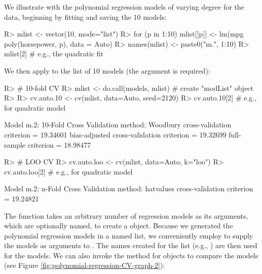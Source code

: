 \documentclass[
]{jss}
\begin{document}
We illustrate with the polynomial regression models of varying degree
for the  data, beginning by fitting and saving the 10 models:

\begin{CodeChunk}
\begin{CodeInput}
R> mlist <- vector(10, mode="list")
R> for (p in 1:10) mlist[[p]] <- lm(mpg ~ poly(horsepower, p), data = Auto)
R> names(mlist) <- paste0("m.", 1:10)
R> mlist[2] # e.g., the quadratic fit
\end{CodeInput}
\end{CodeChunk}

We then apply  to the list of 10 models (the 
argument is required):

\begin{CodeChunk}
\begin{CodeInput}
R> # 10-fold CV
R> mlist <- do.call(models, mlist) # create "modList" object
R> 
R> cv.auto.10 <- cv(mlist, data=Auto, seed=2120)
R> cv.auto.10[2] # e.g., for quadratic model
\end{CodeInput}
\begin{CodeOutput}

Model m.2:
10-Fold Cross Validation
method: Woodbury
cross-validation criterion = 19.34601
bias-adjusted cross-validation criterion = 19.32699
full-sample criterion = 18.98477 
\end{CodeOutput}
\begin{CodeInput}
R> # LOO CV
R> cv.auto.loo <- cv(mlist, data=Auto, k="loo")
R> cv.auto.loo[2] # e.g., for quadratic model
\end{CodeInput}
\begin{CodeOutput}

Model m.2:
n-Fold Cross Validation
method: hatvalues
cross-validation criterion = 19.24821
\end{CodeOutput}
\end{CodeChunk}

The  function takes an arbitrary number of regression
models as its arguments, which are optionally named, to create a
 object. Because we generated the polynomial regression
models in a named list, we conveniently employ  to
supply the models as arguments to . The names created for
the list (e.g., ) are then used for the models. We can also
invoke the  method for  objects to
compare the models (see Figure
\ref{fig:polynomial-regression-CV-graph-2}):
\end{document}
